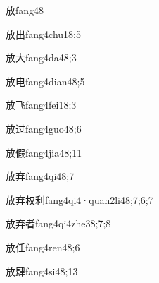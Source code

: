 \begin{verbete}{放}{fang4}{8}
\end{verbete}

\begin{verbete}{放出}{fang4chu1}{8;5}
\end{verbete}

\begin{verbete}{放大}{fang4da4}{8;3}
\end{verbete}

\begin{verbete}{放电}{fang4dian4}{8;5}
\end{verbete}

\begin{verbete}{放飞}{fang4fei1}{8;3}
\end{verbete}

\begin{verbete}{放过}{fang4guo4}{8;6}
\end{verbete}

\begin{verbete}{放假}{fang4jia4}{8;11}
\end{verbete}

\begin{verbete}{放弃}{fang4qi4}{8;7}
\end{verbete}

\begin{verbete}{放弃权利}{fang4qi4·quan2li4}{8;7;6;7}
\end{verbete}

\begin{verbete}{放弃者}{fang4qi4zhe3}{8;7;8}
\end{verbete}

\begin{verbete}{放任}{fang4ren4}{8;6}
\end{verbete}

\begin{verbete}{放肆}{fang4si4}{8;13}
\end{verbete}

